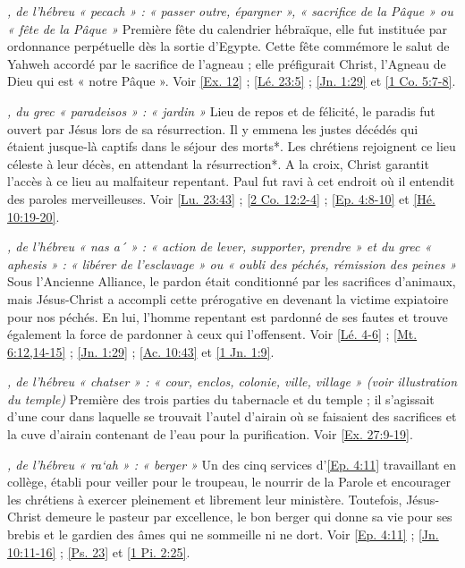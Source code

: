 \begin{multicols}{2}
\textit{, de l'hébreu « pecach » : « passer outre, épargner », « sacrifice de la Pâque » ou « fête de la Pâque »}\newline
Première fête du calendrier hébraïque, elle fut instituée par ordonnance perpétuelle dès la sortie d'Egypte. Cette fête commémore le salut de Yahweh accordé par le sacrifice de l'agneau ; elle préfigurait Christ, l'Agneau de Dieu qui est « notre Pâque ». Voir \vref{Ex. 12} ; \vref{Lé. 23:5} ; \vref{Jn. 1:29} et \vref{1 Co. 5:7-8}.

\textit{, du grec « paradeisos » : « jardin »}\newline
Lieu de repos et de félicité, le paradis fut ouvert par Jésus lors de sa résurrection. Il y emmena les justes décédés qui étaient jusque-là captifs dans le séjour des morts*. Les chrétiens rejoignent ce lieu céleste à leur décès, en attendant la résurrection*. A la croix, Christ garantit l'accès à ce lieu au malfaiteur repentant. Paul fut ravi à cet endroit où il entendit des paroles merveilleuses. Voir \vref{Lu. 23:43} ; \vref{2 Co. 12:2-4} ; \vref{Ep. 4:8-10} et \vref{Hé. 10:19-20}.

\textit{, de l'hébreu « nas a´ » : « action de lever, supporter, prendre » et du grec « aphesis » : « libérer de l'esclavage » ou « oubli des péchés, rémission des peines »}\newline
Sous l'Ancienne Alliance, le pardon était conditionné par les sacrifices d'animaux, mais Jésus-Christ a accompli cette prérogative en devenant la victime expiatoire pour nos péchés. En lui, l'homme repentant est pardonné de ses fautes et trouve également la force de pardonner à ceux qui l'offensent. Voir \vref{Lé. 4-6} ; \vref{Mt. 6:12,14-15} ; \vref{Jn. 1:29} ; \vref{Ac. 10:43} et \vref{1 Jn. 1:9}.

\textit{, de l'hébreu « chatser » : « cour, enclos, colonie, ville, village » (voir illustration du temple)}\newline
Première des trois parties du tabernacle et du temple ; il s'agissait d'une cour dans laquelle se trouvait l'autel d'airain où se faisaient des sacrifices et la cuve d'airain contenant de l'eau pour la purification. Voir \vref{Ex. 27:9-19}.

\textit{, de l'hébreu « ra`ah » : « berger »}\newline
Un des cinq services d'\vref{Ep. 4:11} travaillant en collège, établi pour veiller pour le troupeau, le nourrir de la Parole et encourager les chrétiens à exercer pleinement et librement leur ministère. Toutefois, Jésus-Christ demeure le pasteur par excellence, le bon berger qui donne sa vie pour ses brebis et le gardien des âmes qui ne sommeille ni ne dort. Voir \vref{Ep. 4:11} ; \vref{Jn. 10:11-16} ; \vref{Ps. 23} et \vref{1 Pi. 2:25}.


\end{multicols}
